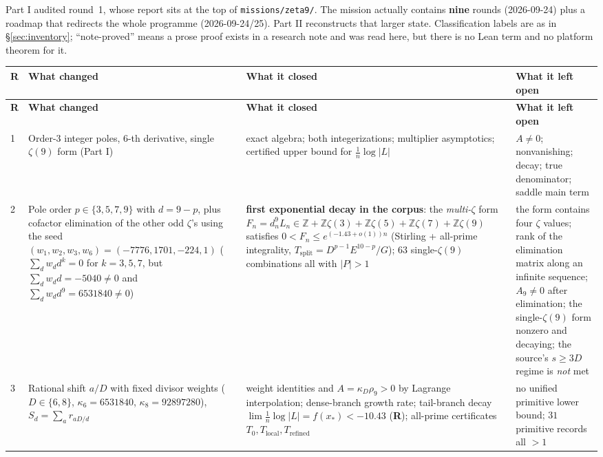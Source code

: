\documentclass[11pt]{article}
\newcommand{\stR}{\textcolor{okgreen}{\textbf{R}}}
\newcommand{\Z}{\mathbb{Z}}
\begin{document}
Part I audited round~1, whose report sits at the top of \texttt{missions/zeta9/}. The mission
actually contains \textbf{nine} rounds (2026-09-24) plus a roadmap that redirects the whole
programme (2026-09-24/25). Part II reconstructs that larger state. Classification labels are as in
\S\ref{sec:inventory}; ``note-proved'' means a prose proof exists in a research note and was read
here, but there is no Lean term and no platform theorem for it.

\begin{longtable}{@{}p{}p{}p{}p{}@{}}
\toprule \textbf{R} & \textbf{What changed} & \textbf{What it closed} & \textbf{What it left open} \\ \midrule
\endfirsthead
\toprule \textbf{R} & \textbf{What changed} & \textbf{What it closed} & \textbf{What it left open} \\ \midrule
\endhead
1 & Order-3 integer poles, $6$-th derivative, single $\zeta(9)$ form (Part I) & exact algebra; both
    integerizations; multiplier asymptotics; certified upper bound for $\frac1n\log|L|$ & $A\ne0$;
    nonvanishing; decay; true denominator; saddle main term \\
2 & Pole order $p\in\{3,5,7,9\}$ with $d=9-p$, plus cofactor elimination of the other odd
    $\zeta$'s using the seed $(w_1,w_2,w_3,w_6)=(-7776,1701,-224,1)$
    ($\sum_dw_dd^{k}=0$ for $k=3,5,7$, but $\sum_dw_dd=-5040\ne0$ and
    $\sum_dw_dd^{9}=6531840\ne0$) &
    \textcolor{okgreen}{\textbf{first exponential decay in the corpus}}: the \emph{multi-}$\zeta$
    form $F_n=d_n^9L_n\in\Z+\Z\zeta(3)+\Z\zeta(5)+\Z\zeta(7)+\Z\zeta(9)$ satisfies
    $0<F_n\le e^{(-1.43+o(1))n}$ (Stirling + all-prime integrality, $T_{\text{split}}=D^{p-1}E^{10-p}/G$);
    $63$ single-$\zeta(9)$ combinations all with $|P|>1$ & the form contains four $\zeta$ values;
    rank of the elimination matrix along an infinite sequence; $A_9\ne0$ after elimination; the
    single-$\zeta(9)$ form nonzero and decaying; the source's $s\ge3D$ regime is \emph{not} met \\
3 & Rational shift $a/D$ with fixed divisor weights ($D\in\{6,8\}$,
    $\kappa_6=6531840$, $\kappa_8=92897280$), $S_d=\sum_a r_{aD/d}$ & weight identities and
    $A=\kappa_D\rho_9>0$ by Lagrange interpolation; dense-branch growth rate; tail-branch decay
    $\lim\frac1n\log|L|=f(x_*)<-10.43$ (\stR); all-prime certificates $T_0,T_{\text{local}},
    T_{\text{refined}}$ & no unified primitive lower bound; $31$ primitive records all $>1$ \\

\end{longtable}
\end{document}
